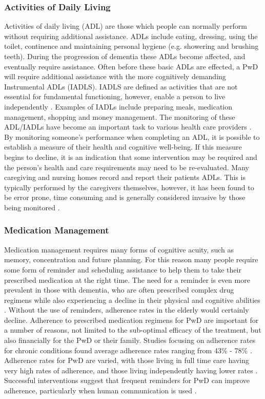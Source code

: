 \subsubsection{Activities of Daily Living}
Activities of daily living (ADL) are those which people can normally perform without requiring additional assistance. ADLs include eating, dressing, using the toilet, continence and maintaining personal hygiene (e.g. showering and brushing teeth). During the progression of dementia these ADLs become affected, and eventually require assistance. Often before these basic ADLs are effected, a PwD will require additional assistance with the more cognitively demanding Instrumental ADLs (IADLS). IADLS are defined as activities that are not essential for fundamental functioning, however, enable a person to live independently \cite{Bookman2007}. Examples of IADLs include preparing meals, medication management, shopping and money management.
The monitoring of these ADL/IADLs have become an important task to various health care providers \cite{Philipose2004}. By monitoring someone's performance when completing an ADL, it is possible to establish a measure of their health and cognitive well-being. If this measure begins to decline, it is an indication that some intervention may be required and the person's health and care requirements may need to be re-evaluated. Many caregiving and nursing homes record and report their patients ADLs.
This is typically performed by the caregivers themselves, however, it has been found to be error prone, time consuming and is generally considered invasive by those being monitored \cite{McDonald2001}.

\subsubsection{Medication Management}
Medication management requires many forms of cognitive acuity, such as memory, concentration and future planning. For this reason many people require some form of reminder and scheduling assistance to help them to take their prescribed medication at the right time. The need for a reminder is even more prevalent in those with dementia, who are often prescribed complex drug regimens while also experiencing a decline in their physical and cognitive abilities \cite{Elliott2009}.
Without the use of reminders, adherence rates in the elderly would certainly decline. Adherence to prescribed medication regimens for PwD are important for a number of reasons, not limited to the sub-optimal efficacy of the treatment, but also financially for the PwD or their family. Studies focusing on adherence rates for chronic conditions found average adherence rates ranging from 43\% - 78\% \cite{Claxton2001, Cramer2003}. Adherence rates for PwD are varied, with those living in full time care having very high rates of adherence, and those living independently having lower rates \cite{Campbell2012a}.  Successful interventions suggest that frequent reminders for PwD can improve adherence, particularly when human communication is used \cite{Campbell2012a}.

